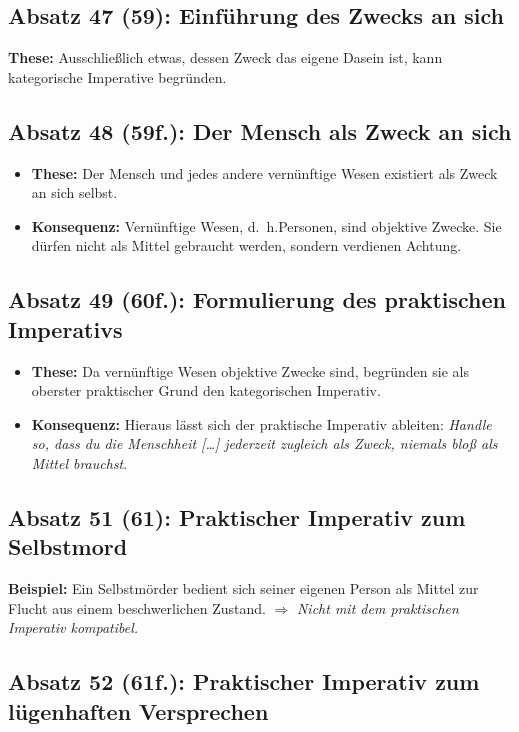 \documentclass{llncs}
\begin{document}
\subsection*{Absatz 47 (59): Einführung des Zwecks an sich}

\textbf{These:} Ausschließlich etwas, dessen Zweck das eigene Dasein ist, kann kategorische Imperative begründen.

\subsection*{Absatz 48 (59f.): Der Mensch als Zweck an sich}

\begin{itemize}
	\item \textbf{These:} Der Mensch und jedes andere vernünftige Wesen existiert als Zweck an sich selbst.
	\item \textbf{Konsequenz:} Vernünftige Wesen, d.~h.\@ Personen, sind objektive Zwecke. Sie dürfen nicht als Mittel gebraucht werden, sondern verdienen Achtung.
\end{itemize}

\subsection*{Absatz 49 (60f.): Formulierung des praktischen Imperativs}

\begin{itemize}
	\item \textbf{These:} Da vernünftige Wesen objektive Zwecke sind, begründen sie als oberster praktischer Grund den kate\-gorischen Imperativ.
	\item \textbf{Konsequenz:} Hieraus lässt sich der praktische Imperativ ableiten: \textit{Handle so, dass du die Menschheit [\ldots] jederzeit zugleich als Zweck, niemals bloß als Mittel brauchst}.
\end{itemize}

\subsection*{Absatz 51 (61): Praktischer Imperativ zum Selbstmord}

\textbf{Beispiel:} Ein Selbstmörder bedient sich seiner eigenen Person als Mittel zur Flucht aus einem beschwerlichen Zustand. $\Rightarrow$ \textit{Nicht mit dem praktischen Imperativ kompatibel.}

\subsection*{Absatz 52 (61f.): Praktischer Imperativ zum lügenhaften Versprechen}
\end{document}
